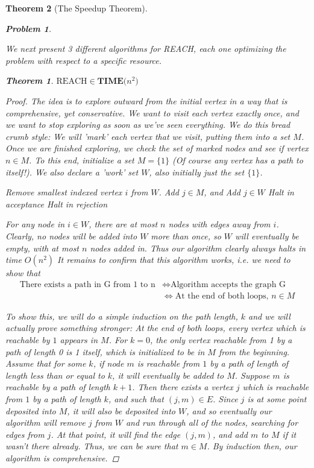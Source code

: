 \documentclass{article}
\theoremstyle{definition}
\newtheorem{problem}{Problem}
\theoremstyle{plain}
\theoremstyle{theorem}
\newtheorem{theorem}{Theorem}[section]
\begin{document}
\begin{theorem}[The Speedup Theorem]
\begin{problem}
\begin{center}
\end{center}
\end{problem}
We next present 3 different algorithms for REACH, each one optimizing the problem with respect to a specific resource. 
\begin{theorem}
    $\textrm{REACH} \in \textbf{TIME($n^2$)}$
\end{theorem}
\begin{proof}
The idea is to explore outward from the initial vertex in a way that is comprehensive, yet conservative. We want to visit each vertex exactly once, and we want to stop exploring as soon as we've seen everything. We do this bread crumb style: We will 'mark' each vertex that we visit, putting them into a set $M$. Once we are finished exploring, we check the set of marked nodes and see if vertex $n \in M$. To this end, initialize a set $M = \{1\}$ (Of course any vertex has a path to itself!). We also declare a 'work' set $W$, also initially just the set $\{1\}$. 
\begin{algorithmic}
    \STATE Remove smallest indexed vertex $i$ from $W$.
            \STATE Add $j \in M$, and Add $j \in W$
        \ENDIF    
    \ENDFOR
\ENDWHILE
{}
    \STATE Halt in acceptance
\ELSE
    \STATE Halt in rejection
\ENDIF
\end{algorithmic}
\par For any node in $i \in W$, there are at most $n$ nodes with edges away from $i$. Clearly, no nodes will be added into $W$ more than once, so $W$ will eventually be empty, with at most $n$ nodes added in. Thus our algorithm clearly always halts in time $O(n^2)$ It remains to confirm that this algorithm works, i.e. we need to show that
\begin{align*}
    \textrm{There exists a path in G from 1 to n} & \iff \textrm{Algorithm accepts the graph G} \\
                                                & \iff \textrm{At the end of both loops, $n \in M$}
\end{align*}
\par To show this, we will do a simple induction on the path length, $k$ and we will actually prove something stronger: At the end of both loops, \textit{every} vertex which is reachable by $1$ appears in $M$. For $k=0$, the only vertex reachable from 1 by a path of length 0 is 1 itself, which is initialized to be in $M$ from the beginning. Assume that for some $k$, if node $m$ is reachable from $1$ by a path of length of length less than or equal to $k$, it will eventually be added to $M$. Suppose $m$ is reachable by a path of length $k+1$. Then there exists a vertex $j$ which is reachable from $1$ by a path of length $k$, and such that $(j,m) \in E$. Since $j$ is at some point deposited into $M$, it will also be deposited into $W$, and so eventually our algorithm will remove $j$ from $W$ and run through all of the nodes, searching for edges from $j$. At that point, it will find the edge $(j,m)$, and add $m$ to $M$ if it wasn't there already. Thus, we can be sure that $m \in M$. By induction then, our algorithm is comprehensive.

\end{proof}
\end{theorem}
\end{document}
